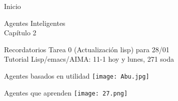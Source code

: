\documentclass{beamer}
\theoremstyle{definition}
\theoremstyle{theorem}
\theoremstyle{remark}
\begin{document}
\renewcommand{\tablename}{Table}
\renewcommand{\figurename}{\scriptsize Figure}

\begin{frame}{Inicio}
\begin{center}
    Agentes Inteligentes \\
    Capítulo 2
\end{center}
\end{frame}

\begin{frame}{Recordatorios}
Tarea 0 (Actualización lisp) para 28/01 \\
Tutorial Lisp/emacs/AIMA: 11-1 hoy y lunes, 271 soda

\end{frame}

\begin{frame}{Agentes basados en utilidad}
  \texttt{[image: Abu.jpg]} 
\end{frame}

\begin{frame}{Agentes que aprenden}
  \texttt{[image: 27.png]}
\end{frame}
\end{document}
